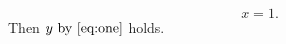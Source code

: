 \documentclass{article}
\begin{document}
\begin{equation}\label{eq:one} x=1. \end{equation}
Then $y \text{ by \cref{eq:one}}$ holds.
\end{document}
